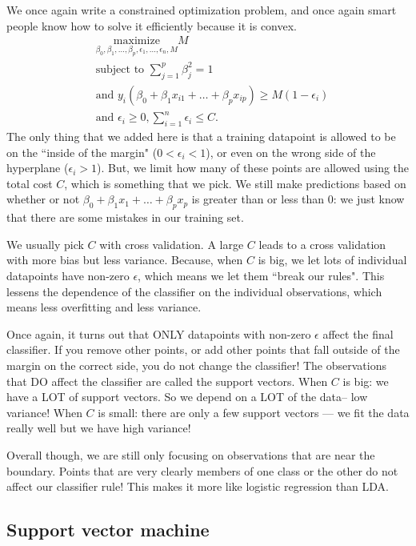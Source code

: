 We once again write a constrained optimization problem, and once again smart people know how to solve it efficiently because it is convex.
\begin{align*}
&\underset{{\beta_0, \beta_1, \ldots, \beta_p, \epsilon_1, \ldots, \epsilon_n, M}}{\mathrm{maximize}} M \\
&\text{subject to } \sum_{j=1}^p \beta_j^2 = 1 \\
&\text{and } y_i (\beta_0 + \beta_1 x_{i1} + \ldots + \beta_p x_{ip} ) \geq M (1-\epsilon_i) \\ 
&\text{and } \epsilon_i \geq 0, \sum_{i=1}^n \epsilon_i \leq C. 
\end{align*} 
The only thing that we added here is that a training datapoint is allowed to be on the ``inside of the margin" ($0 < \epsilon_i < 1$), or even on the wrong side of the hyperplane ($\epsilon_i > 1$). But, we limit how many of these points are allowed using the total cost $C$, which is something that we pick. We still make predictions based on whether or not $\beta_0 + \beta_1 x_{1} + \ldots + \beta_p x_{p}$ is greater than or less than $0$: we just know that there are some mistakes in our training set. 

We usually pick $C$ with cross validation. A large $C$ leads to a cross validation with more bias but less variance. Because, when $C$ is big, we let lots of individual datapoints have non-zero $\epsilon$, which means we let them ``break our rules". This lessens the dependence of the classifier on the individual observations, which means less overfitting and less variance. 

Once again, it turns out that ONLY datapoints with non-zero $\epsilon$ affect the final classifier. If you remove other points, or add other points that fall outside of the margin on the correct side, you do not change the classifier! The observations that DO affect the classifier are called the support vectors. When $C$ is big: we have a LOT of support vectors. So we depend on a LOT of the data-- low variance! When $C$ is small: there are only a few support vectors --- we fit the data really well but we have high variance! 

Overall though, we are still only focusing on observations that are near the boundary. Points that are very clearly members of one class or the other do not affect our classifier rule! This makes it more like logistic regression than LDA. 

\subsection{Support vector machine}

